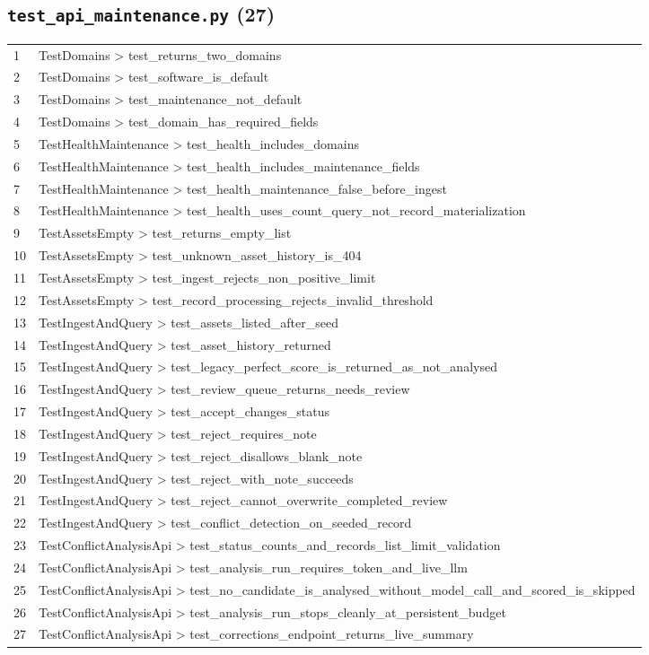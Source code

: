 \subsection*{\texttt{test\_api\_maintenance.py} (27)}
\begin{longtable}{p{}p{}}
1 & TestDomains > test\_returns\_two\_domains \\
2 & TestDomains > test\_software\_is\_default \\
3 & TestDomains > test\_maintenance\_not\_default \\
4 & TestDomains > test\_domain\_has\_required\_fields \\
5 & TestHealthMaintenance > test\_health\_includes\_domains \\
6 & TestHealthMaintenance > test\_health\_includes\_maintenance\_fields \\
7 & TestHealthMaintenance > test\_health\_maintenance\_false\_before\_ingest \\
8 & TestHealthMaintenance > test\_health\_uses\_count\_query\_not\_record\_materialization \\
9 & TestAssetsEmpty > test\_returns\_empty\_list \\
10 & TestAssetsEmpty > test\_unknown\_asset\_history\_is\_404 \\
11 & TestAssetsEmpty > test\_ingest\_rejects\_non\_positive\_limit \\
12 & TestAssetsEmpty > test\_record\_processing\_rejects\_invalid\_threshold \\
13 & TestIngestAndQuery > test\_assets\_listed\_after\_seed \\
14 & TestIngestAndQuery > test\_asset\_history\_returned \\
15 & TestIngestAndQuery > test\_legacy\_perfect\_score\_is\_returned\_as\_not\_analysed \\
16 & TestIngestAndQuery > test\_review\_queue\_returns\_needs\_review \\
17 & TestIngestAndQuery > test\_accept\_changes\_status \\
18 & TestIngestAndQuery > test\_reject\_requires\_note \\
19 & TestIngestAndQuery > test\_reject\_disallows\_blank\_note \\
20 & TestIngestAndQuery > test\_reject\_with\_note\_succeeds \\
21 & TestIngestAndQuery > test\_reject\_cannot\_overwrite\_completed\_review \\
22 & TestIngestAndQuery > test\_conflict\_detection\_on\_seeded\_record \\
23 & TestConflictAnalysisApi > test\_status\_counts\_and\_records\_list\_limit\_validation \\
24 & TestConflictAnalysisApi > test\_analysis\_run\_requires\_token\_and\_live\_llm \\
25 & TestConflictAnalysisApi > test\_no\_candidate\_is\_analysed\_without\_model\_call\_and\_scored\_is\_skipped \\
26 & TestConflictAnalysisApi > test\_analysis\_run\_stops\_cleanly\_at\_persistent\_budget \\
27 & TestConflictAnalysisApi > test\_corrections\_endpoint\_returns\_live\_summary \\
\end{longtable}
